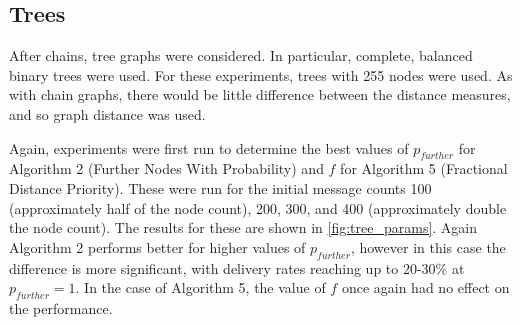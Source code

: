 \documentclass[bsc,frontabs,twoside,singlespacing,parskip,deptreport]{infthesis}     %
\begin{document}
\subsection{Trees}
After chains, tree graphs were considered. In particular, complete, balanced binary trees were used. For these experiments, trees with 255 nodes were used. As with chain graphs, there would be little difference between the distance measures, and so graph distance was used.

Again, experiments were first run to determine the best values of $p_{further}$ for Algorithm 2 (Further Nodes With Probability) and $f$ for Algorithm 5 (Fractional Distance Priority). These were run for the initial message counts 100 (approximately half of the node count), 200, 300, and 400 (approximately double the node count). The results for these are shown in \ref{fig:tree_params}. Again Algorithm 2 performs better for higher values of $p_{further}$, however in this case the difference is more significant, with delivery rates reaching up to 20-30\% at $p_{further}=1$. In the case of Algorithm 5, the value of $f$ once again had no effect on the performance.
\end{document}
